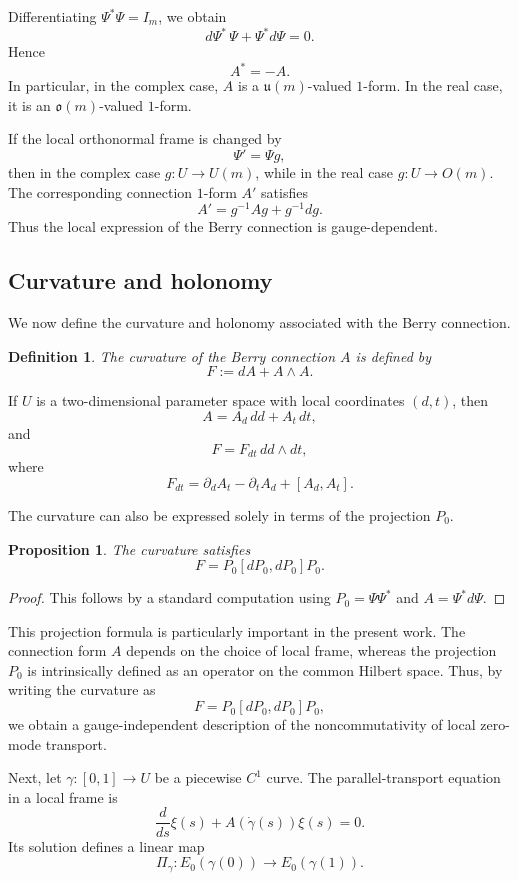 \documentclass[pdflatex,sn-mathphys-num]{sn-jnl}%
\theoremstyle{thmstyleone}%
\newtheorem{proposition}[theorem]{Proposition}%
\theoremstyle{thmstyletwo}%
\theoremstyle{thmstylethree}%
\newtheorem{definition}{Definition}%
\begin{document}
Differentiating \(\Psi^\ast\Psi=I_m\), we obtain
\[
d\Psi^\ast\,\Psi+\Psi^\ast d\Psi=0.
\]
Hence
\[
A^\ast=-A.
\]
In particular, in the complex case, \(A\) is a \(\mathfrak u(m)\)-valued \(1\)-form. In the real case, it is an \(\mathfrak o(m)\)-valued \(1\)-form.

If the local orthonormal frame is changed by
\[
\Psi'=\Psi g,
\]
then in the complex case \(g:U\to U(m)\), while in the real case \(g:U\to O(m)\). The corresponding connection \(1\)-form \(A'\) satisfies
\[
A'=g^{-1}Ag+g^{-1}dg.
\]
Thus the local expression of the Berry connection is gauge-dependent.

\subsection{Curvature and holonomy}

We now define the curvature and holonomy associated with the Berry connection.

\begin{definition}
The curvature of the Berry connection \(A\) is defined by
\[
F:=dA+A\wedge A.
\]
\end{definition}

If \(U\) is a two-dimensional parameter space with local coordinates \((d,t)\), then
\[
A=A_d\,dd+A_t\,dt,
\]
and
\[
F=F_{dt}\,dd\wedge dt,
\]
where
\[
F_{dt}
=
\partial_dA_t-\partial_tA_d+[A_d,A_t].
\]

The curvature can also be expressed solely in terms of the projection \(P_0\).

\begin{proposition}
The curvature satisfies
\[
F=P_0[dP_0,dP_0]P_0.
\]
\end{proposition}

\begin{proof}
This follows by a standard computation using \(P_0=\Psi\Psi^\ast\) and \(A=\Psi^\ast d\Psi\).
\end{proof}

This projection formula is particularly important in the present work. The connection form \(A\) depends on the choice of local frame, whereas the projection \(P_0\) is intrinsically defined as an operator on the common Hilbert space. Thus, by writing the curvature as
\[
F=P_0[dP_0,dP_0]P_0,
\]
we obtain a gauge-independent description of the noncommutativity of local zero-mode transport.

Next, let \(\gamma:[0,1]\to U\) be a piecewise \(C^1\) curve. The parallel-transport equation in a local frame is
\[
\frac{d}{ds}\xi(s)
+
A(\dot\gamma(s))\xi(s)
=
0.
\]
Its solution defines a linear map
\[
\Pi_\gamma:E_0(\gamma(0))\to E_0(\gamma(1)).
\]
\end{document}

